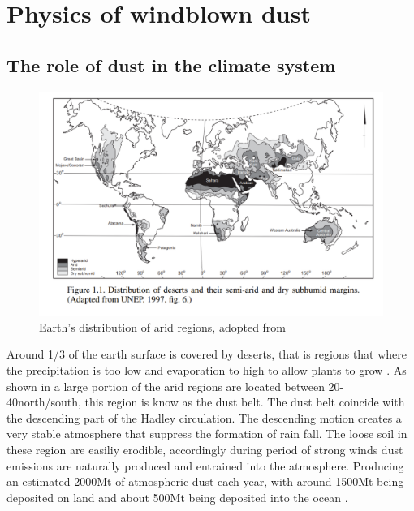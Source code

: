\section{Physics of windblown dust}

\subsection{The role of dust in the climate system}
\begin{figure}[htpb]
    \centering
    \includegraphics[width=\textwidth]{texfiles/figs/Desert_distrubtion.PNG}
    \caption{Earth's distribution of arid regions, adopted from \textcite{williams_climate_2014}}
    \label{fig:desert_distrubtion}
\end{figure}
Around 1/3 of the earth surface is covered by deserts, that is regions that where the precipitation is too low and evaporation to high to allow plants to grow \parencite{williams_climate_2014}. As shown in  a large portion of the arid regions are located between 20\degree - 40\degree north/south, this region is know as the dust belt. The dust belt coincide with the descending part of the Hadley circulation. The descending motion creates a very stable atmosphere that suppress the formation of rain fall. The loose soil in these region are easiliy erodible, accordingly during period of strong winds dust emissions are naturally produced and entrained into the atmosphere. Producing an estimated 2000Mt of atmospheric dust each year, with around 1500Mt being deposited on land and about 500Mt being deposited into the ocean \parencite{shao2011dust}.   

